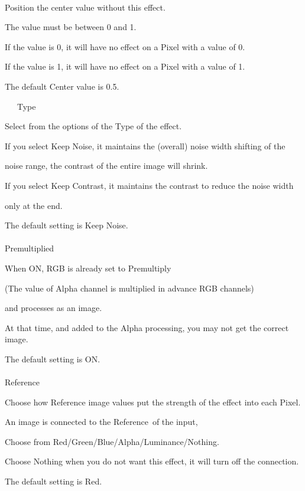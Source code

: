 \documentclass[a4paper,12pt]{article}
\begin{document}
\ \vspace{-0.2em}
\par
Position the center value without this effect.\par
The value must be between 0 and 1.\par
If the value is 0, it will have no effect on a Pixel with a value of 0.\par
If the value is 1, it will have no effect on a Pixel with a value of 1.\par
The default Center value is 0.5.\\
\par
\noindent \ \ \, Type\par
Select from the options of the Type of the effect.\par
If you select \textquotedbl Keep Noise\textquotedbl , it maintains the (overall) noise width shifting of the\par
noise range, the contrast of the entire image will shrink.\par
If you select \textquotedbl Keep Contrast\textquotedbl , it maintains the contrast to reduce the noise width\par
only at the end.\par
The default setting is \textquotedbl Keep Noise\textquotedbl .\\
\\
Premultiplied\par
When ON, RGB is already set to Premultiply\par
(The value of Alpha channel is multiplied in advance RGB channels)\par
and processes as an image.\par
At that time, and added to the Alpha processing, you may not get the correct image.\par
The default setting is ON.\\
\\
Reference\par
Choose how Reference image values put the strength of the effect into each Pixel.\par
An image is connected to the \textquotedbl Reference\textquotedbl \ of the input,\par
Choose from Red/Green/Blue/Alpha/Luminance/Nothing.\par
Choose Nothing when you do not want this effect, it will turn off the connection.\par
The default setting is Red.

\newpage
\end{document}
